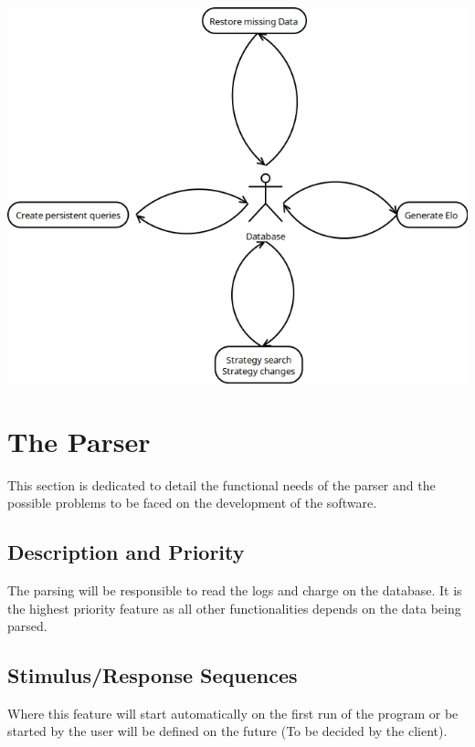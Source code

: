 \documentclass{scrreprt}
\begin{document}
\includegraphics[width=\textwidth,height=\textheight,keepaspectratio]{UseCaseDataMining}

\newpage




\section{The Parser}
This section is dedicated to detail the functional needs of the parser and the
possible problems to be faced on the development of the software.

\subsection{Description and Priority}
The parsing will be responsible to read the logs and charge on the database. It
is the highest priority feature as all other functionalities depends on the data
being parsed.

\subsection{Stimulus/Response Sequences}
Where this feature will start automatically on the first run of the program or
be started by the user will be defined on the future (To be decided by the client).
\end{document}
